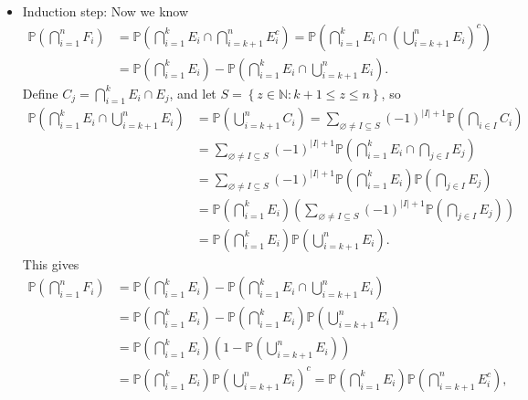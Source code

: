 \documentclass[a4paper,12pt]{article}
\begin{document}
\begin{itemize}
\begin{itemize}
		\item Induction step: Now we know 
		\begin{align*}
			\mathbb{P} \left( \bigcap_{i=1}^{n} F_i  \right) &= \mathbb{P} \left( \bigcap_{i=1}^{k} E_i \cap \bigcap_{i=k+1}^{n} E_i^c   \right) = \mathbb{P} \left( \bigcap_{i=1}^{k} E_i \cap \left( \bigcup_{i=k+1}^{n} E_i \right)^c   \right) \\
			&= \mathbb{P} \left( \bigcap_{i=1}^{k} E_i \right) - \mathbb{P} \left( \bigcap_{i=1}^{k} E_i \cap \bigcup_{i=k+1}^{n} E_i \right).   
		\end{align*}
		Define \(C_j = \bigcap_{i=1}^{k} E_i \cap E_j \), and let \(S = \left\{ z \in \mathbb{N} : k + 1 \le z \le n \right\} \), so 
		\begin{align*}
			\mathbb{P} \left( \bigcap_{i=1}^{k} E_i \cap \bigcup_{i=k+1}^{n} E_i \right) &= \mathbb{P} \left( \bigcup_{i=k+1}^{n} C_i \right) = \sum_{\varnothing \neq I \subseteq S} (-1)^{\vert I \vert + 1} \mathbb{P} \left( \bigcap_{i \in I} C_i  \right) \\
			&= \sum_{\varnothing \neq I \subseteq S} (-1)^{\vert I \vert + 1} \mathbb{P} \left( \bigcap_{i=1}^{k} E_i \cap \bigcap_{j \in I} E_j   \right) \\
			&= \sum_{\varnothing \neq I \subseteq S} (-1)^{\vert I \vert + 1} \mathbb{P} \left( \bigcap_{i=1}^k E_i  \right) \mathbb{P} \left( \bigcap_{j \in I} E_j  \right) \\
			&= \mathbb{P} \left( \bigcap_{i=1}^k E_i  \right) \left( \sum_{\varnothing \neq I \subseteq S} (-1)^{\vert I \vert + 1} \mathbb{P} \left( \bigcap_{j \in I} E_j  \right) \right) \\
			&= \mathbb{P} \left( \bigcap_{i=1}^k E_i  \right) \mathbb{P} \left( \bigcup_{i=k+1}^{n} E_i  \right).          
		\end{align*} 
		This gives 
		\begin{align*}
			\mathbb{P} \left( \bigcap_{i=1}^{n} F_i  \right) &= \mathbb{P} \left( \bigcap_{i=1}^{k} E_i \right) - \mathbb{P} \left( \bigcap_{i=1}^{k} E_i \cap \bigcup_{i=k+1}^{n} E_i \right) \\
			&= \mathbb{P} \left( \bigcap_{i=1}^{k} E_i  \right) - \mathbb{P} \left( \bigcap_{i=1}^{k} E_i  \right) \mathbb{P} \left( \bigcup_{i=k+1}^{n} E_i  \right) \\
			&= \mathbb{P} \left( \bigcap_{i=1}^{k} E_i  \right)  \left( 1 - \mathbb{P} \left( \bigcup_{i=k+1}^{n} E_i  \right)  \right) \\
			&= \mathbb{P} \left( \bigcap_{i=1}^{k} E_i  \right)  \mathbb{P} \left( \bigcup_{i=k+1}^{n} E_i  \right)^c = \mathbb{P} \left( \bigcap_{i=1}^{k} E_i  \right)  \mathbb{P} \left( \bigcap_{i=k+1}^{n} E_i^c  \right),      

\end{align*}
\end{itemize}
\end{itemize}
\end{document}
